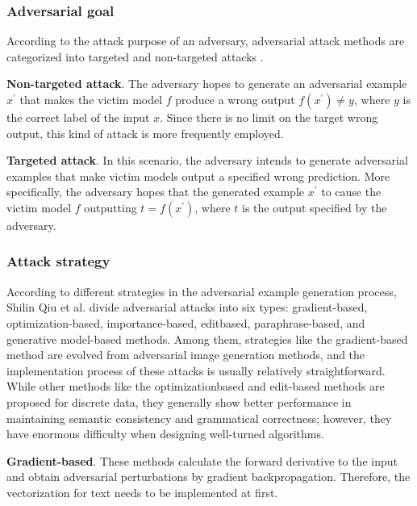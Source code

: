 \subsubsection{Adversarial goal}\label{subsubsec:adversarial-goal}

According to the attack purpose of an adversary, adversarial
attack methods are categorized into targeted and non-targeted attacks \cite{QIU2022278}.

\textbf{Non-targeted attack}. The adversary hopes to generate an adversarial example $x^\prime$ that makes the victim model $f$ produce a wrong output $f(x^\prime) \neq y$, where $y$ is the correct label of the input $x$. Since there is no limit on the target wrong output, this kind of attack is more frequently employed.

\textbf{Targeted attack}. In this scenario, the adversary intends to generate adversarial examples that make victim models output a specified wrong prediction. More specifically, the adversary hopes that the generated example $x^\prime$ to cause the victim model $f$ outputting $t=f(x^\prime)$, where $t$ is the output specified by the adversary.

\subsubsection{Attack strategy}\label{subsubsec:attack-strategy}

According to different strategies in the adversarial example generation process, Shilin Qiu et al. \cite{QIU2022278} divide adversarial attacks into six types: gradient-based, optimization-based, importance-based, editbased, paraphrase-based, and generative model-based methods. Among them, strategies like the gradient-based method are evolved from adversarial image generation methods, and the implementation process of these attacks is usually relatively straightforward. While other methods like the optimizationbased and edit-based methods are proposed for discrete data, they generally show better performance in maintaining semantic consistency and grammatical correctness; however, they have enormous difficulty when designing well-turned algorithms.

\textbf{Gradient-based}. These methods calculate the forward derivative to the input and obtain adversarial perturbations by gradient backpropagation. Therefore, the vectorization for text needs to be implemented at first.

